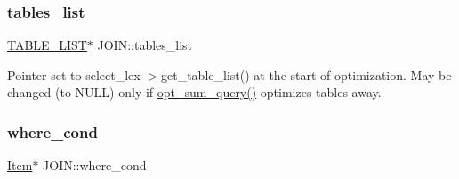 \subsubsection{\texorpdfstring{tables\+\_\+list}{tables\_list}}
{\footnotesize\ttfamily \mbox{\hyperlink{structTABLE__LIST}{T\+A\+B\+L\+E\+\_\+\+L\+I\+ST}}$\ast$ J\+O\+I\+N\+::tables\+\_\+list}

Pointer set to select\+\_\+lex-\/$>$get\+\_\+table\+\_\+list() at the start of optimization. May be changed (to N\+U\+LL) only if \mbox{\hyperlink{opt__sum_8cc_a89d353b7a877388083c43aed53124034}{opt\+\_\+sum\+\_\+query()}} optimizes tables away. \mbox{\label{classJOIN_af432939b3df4197b8ebdc46ce8c82e4d}} 
\subsubsection{\texorpdfstring{where\+\_\+cond}{where\_cond}}
{\footnotesize\ttfamily \mbox{\hyperlink{classItem}{Item}}$\ast$ J\+O\+I\+N\+::where\+\_\+cond}


